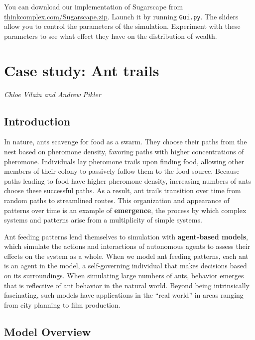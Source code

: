 \documentclass[10pt]{book}
\begin{document}
\begin{exercise}

You can download our implementation of Sugarscape from
\url{thinkcomplex.com/Sugarscape.zip}.  Launch it by running
{\tt Gui.py}.  The sliders allow you to control the parameters
of the simulation.  Experiment with these parameters to see what
effect they have on the distribution of wealth.

\end{exercise}


\chapter{Case study: Ant trails}

{\em Chloe Vilain and Andrew Pikler}

\section{Introduction}

In nature, ants scavenge for food as a swarm. They choose their paths
from the nest based on pheromone density, favoring paths with higher
concentrations of pheromone.  Individuals lay pheromone trails upon
finding food, allowing other members of their colony to passively
follow them to the food source.  Because paths leading to food have
higher pheromone density, increasing numbers of ants choose these
successful paths.  As a result, ant trails transition over time from
random paths to streamlined routes.  This organization and appearance
of patterns over time is an example of \textbf{emergence}, the process
by which complex systems and patterns arise from a multiplicity of
simple systems.

Ant feeding patterns lend themselves to simulation with
\textbf{agent-based models}, which simulate the actions and
interactions of autonomous agents to assess their effects on the
system as a whole.  When we model ant feeding patterns, each ant is an
agent in the model, a self-governing individual that makes decisions
based on its surroundings.  When simulating large numbers of ants,
behavior emerges that is reflective of ant behavior in the natural
world.  Beyond being intrinsically fascinating, such models have
applications in the ``real world'' in areas ranging from city planning
to film production.

\section{Model Overview}
\end{document}
